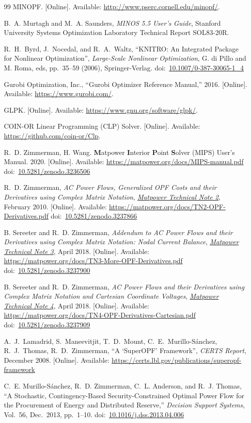 \documentclass[12pt]{article}
\newcommand{\matpower}[0]{{\sc Matpower}}
\newcommand{\mips}[0]{{MIPS}}
\newcommand{\mipsname}[0]{{{\bf M}{\sc atpower} \textbf{I}nterior \textbf{P}oint \textbf{S}olver}}
\newcommand{\currentmipsmanurl}[0]{https://matpower.org/docs/MIPS-manual.pdf}
\newcommand{\TNtwourl}[0]{https://matpower.org/docs/TN2-OPF-Derivatives.pdf}
\newcommand{\TNtwo}[0]{\href{\TNtwourl}{\it \matpower{} Technical Note 2}}
\newcommand{\TNthreeurl}[0]{https://matpower.org/docs/TN3-More-OPF-Derivatives.pdf}
\newcommand{\TNthree}[0]{\href{\TNthreeurl}{\it \matpower{} Technical Note 3}}
\newcommand{\TNfoururl}[0]{https://matpower.org/docs/TN4-OPF-Derivatives-Cartesian.pdf}
\newcommand{\TNfour}[0]{\href{\TNfoururl}{\it \matpower{} Technical Note 4}}
\newcommand{\doi}[1]{doi:~\href{https://doi.org/#1}{#1}}
\numberwithin{equation}{section}
\numberwithin{table}{section}
\numberwithin{figure}{section}
\begin{document}
\begin{thebibliography}{99}
MINOPF. [Online]. Available:
  \url{http://www.pserc.cornell.edu/minopf/}.

B.~A. Murtagh and M.~A. Saunders, \emph{MINOS 5.5 User's Guide}, Stanford
  University Systems Optimization Laboratory Technical Report SOL83-20R.

R.~H.~Byrd, J.~Nocedal, and R.~A.~Waltz, ``KNITRO: An Integrated Package for Nonlinear Optimization'', \emph{Large-Scale Nonlinear Optimization}, G. di Pillo and M. Roma, eds, pp.~35--59 (2006), Springer-Verlag.
doi:~\href{https://doi.org/10.1007/0-387-30065-1_4}{10.1007/0-387-30065-1\_4}

Gurobi Optimization, Inc., ``Gurobi Optimizer Reference Manual,'' 2016. [Online]. Available:
  \url{https://www.gurobi.com/}.

GLPK. [Online]. Available:
  \url{https://www.gnu.org/software/glpk/}.

COIN-OR Linear Programming (CLP) Solver. [Online]. Available:
  \url{https://github.com/coin-or/Clp}.

R.~D. Zimmerman, H. Wang. \mipsname{} (\mips{}) User's Manual. 2020. [Online]. Available: \url{\currentmipsmanurl}
\doi{10.5281/zenodo.3236506}

R.~D. Zimmerman, \emph{AC Power Flows, Generalized OPF Costs and their Derivatives using Complex Matrix Notation}, \TNtwo, February 2010. [Online]. Available: \url{\TNtwourl}
\doi{10.5281/zenodo.3237866}

B. Sereeter and R.~D. Zimmerman, \emph{Addendum to AC Power Flows and their Derivatives using Complex Matrix Notation: Nodal Current Balance}, \TNthree, April 2018. [Online]. Available: \url{\TNthreeurl}
\doi{10.5281/zenodo.3237900}

B. Sereeter and R.~D. Zimmerman, \emph{AC Power Flows and their Derivatives using Complex Matrix Notation and Cartesian Coordinate Voltages}, \TNfour, April 2018. [Online]. Available: \url{\TNfoururl}
\doi{10.5281/zenodo.3237909}

A.~J.~Lamadrid, S.~Maneevitjit, T.~D.~Mount, C.~E.~Murillo-S{\'a}nchez, R.~J.~Thomas, R.~D.~Zimmerman, ``A `SuperOPF' Framework'', \emph{CERTS Report}, December 2008. [Online]. Available: \url{https://certs.lbl.gov/publications/superopf-framework}

C.~E. Murillo-S{\'a}nchez, R.~D. Zimmerman, C.~L. Anderson, and R.~J. Thomas, ``A Stochastic, Contingency-Based Security-Constrained Optimal Power Flow for the Procurement of Energy and Distributed Reserve,'' \emph{Decision Support Systems}, Vol.~56, Dec.~2013, pp.~1--10.
\doi{10.1016/j.dss.2013.04.006}


\end{thebibliography}
\end{document}
